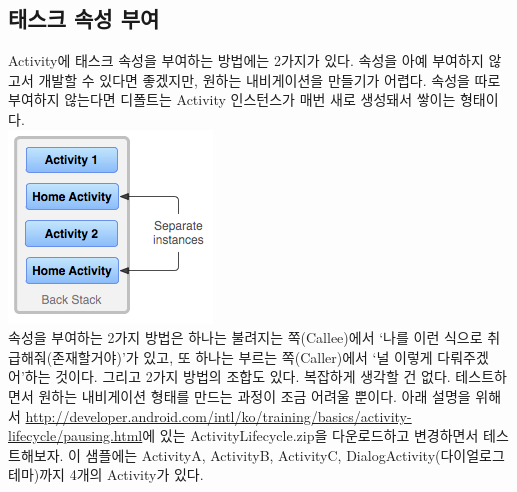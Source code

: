 
\subsection{태스크 속성 부여}
Activity에 태스크 속성을 부여하는 방법에는 2가지가 있다. 속성을 아예 부여하지 않고서 개발할 수 있다면 좋겠지만, 원하는 내비게이션을 만들기가 어렵다. 
속성을 따로 부여하지 않는다면 디폴트는 Activity 인스턴스가 매번 새로 생성돼서 쌓이는 형태이다.\\
\includegraphics[scale=0.7]{diagram_multiple_instances}\\
속성을 부여하는 2가지 방법은 하나는 불려지는 쪽(Callee)에서 `나를 이런 식으로 취급해줘(존재할거야)'가 있고, 또 하나는 부르는 쪽(Caller)에서 `널 이렇게 다뤄주겠어'하는 것이다. 그리고 2가지 방법의 조합도 있다.
복잡하게 생각할 건 없다. 테스트하면서 원하는 내비게이션 형태를 만드는 과정이 조금 어려울 뿐이다.
아래 설명을 위해서 \url{http://developer.android.com/intl/ko/training/basics/activity-lifecycle/pausing.html}에 있는 ActivityLifecycle.zip을 다운로드하고 변경하면서 테스트해보자. 
이 샘플에는 ActivityA, ActivityB, ActivityC, DialogActivity(다이얼로그 테마)까지 4개의 Activity가 있다.

